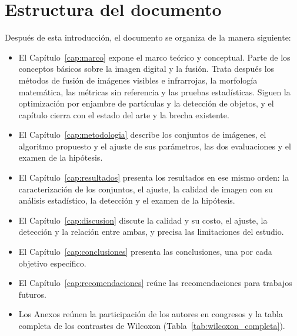 \section{Estructura del documento}
\label{sec:estructura}

Después de esta introducción, el documento se organiza de la manera siguiente:

\begin{itemize}
\item El Capítulo~\ref{cap:marco} expone el marco teórico y conceptual. Parte de los conceptos básicos
sobre la imagen digital y la fusión. Trata después los métodos de fusión de imágenes visibles e
infrarrojas, la morfología matemática, las métricas sin referencia y las pruebas estadísticas. Siguen
la optimización por enjambre de partículas y la detección de objetos, y el capítulo
cierra con el estado del arte y la brecha existente.
\item El Capítulo~\ref{cap:metodologia} describe los conjuntos de imágenes, el algoritmo propuesto y el
ajuste de sus parámetros, las dos evaluaciones y el examen de la hipótesis.
\item El Capítulo~\ref{cap:resultados} presenta los resultados en ese mismo orden: la caracterización de
los conjuntos, el ajuste, la calidad de imagen con su análisis estadístico, la detección y el examen de
la hipótesis.
\item El Capítulo~\ref{cap:discusion} discute la calidad y su costo, el ajuste, la detección y la
relación entre ambas, y precisa las limitaciones del estudio.
\item El Capítulo~\ref{cap:conclusiones} presenta las conclusiones, una por cada objetivo específico.
\item El Capítulo~\ref{cap:recomendaciones} reúne las recomendaciones para trabajos futuros.
\item Los Anexos reúnen la participación de los autores en congresos y la tabla completa de los
contrastes de Wilcoxon (Tabla~\ref{tab:wilcoxon_completa}).
\end{itemize}
